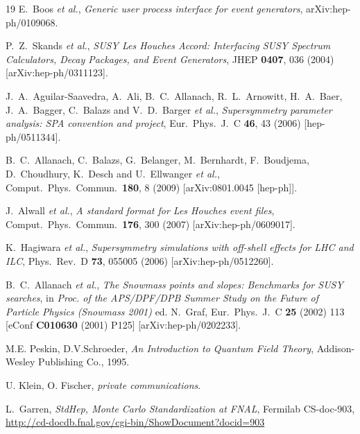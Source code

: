 \documentclass[12pt]{book}
\begin{document}
\begin{thebibliography}{19}
  E.~Boos {\it et al.},
  {\em Generic user process interface for event generators},
  arXiv:hep-ph/0109068.

  P.~Z.~Skands {\it et al.},
  {\em SUSY Les Houches Accord: Interfacing SUSY Spectrum Calculators, Decay
  Packages, and Event Generators},
  JHEP {\bf 0407}, 036 (2004)
  [arXiv:hep-ph/0311123].

  J.~A.~Aguilar-Saavedra, A.~Ali, B.~C.~Allanach, R.~L.~Arnowitt, H.~A.~Baer, J.~A.~Bagger, C.~Balazs and V.~D.~Barger {\it et al.},
  {\em Supersymmetry parameter analysis: SPA convention and project},
  Eur.\ Phys.\ J.\ C {\bf 46}, 43 (2006)
  [hep-ph/0511344].

  B.~C.~Allanach, C.~Balazs, G.~Belanger, M.~Bernhardt, F.~Boudjema, D.~Choudhury, K.~Desch and U.~Ellwanger {\it et al.},
  Comput.\ Phys.\ Commun.\  {\bf 180}, 8 (2009)
  [arXiv:0801.0045 [hep-ph]].

  J.~Alwall {\it et al.},
  {\em A standard format for Les Houches event files},
  Comput.\ Phys.\ Commun.\  {\bf 176}, 300 (2007)
  [arXiv:hep-ph/0609017].

  K.~Hagiwara {\it et al.},
  {\em Supersymmetry simulations with off-shell effects for LHC and
    ILC},
  Phys.\ Rev.\  D {\bf 73}, 055005 (2006)
  [arXiv:hep-ph/0512260].

  B.~C.~Allanach {\it et al.},
  {\em The Snowmass points and slopes: Benchmarks for SUSY searches},
  in {\it Proc. of the APS/DPF/DPB Summer Study on the Future of Particle Physics (Snowmass 2001) } ed. N.~Graf,
  Eur.\ Phys.\ J.\ C {\bf 25} (2002) 113
  [eConf {\bf C010630} (2001) P125]
  [arXiv:hep-ph/0202233].

  M.E. Peskin, D.V.Schroeder, {\em An Introduction to Quantum Field
    Theory}, Addison-Wesley Publishing Co., 1995.

  U. Klein, O. Fischer, {\em private communications}.

  L.~Garren, {\em StdHep, Monte Carlo Standardization at FNAL},
  Fermilab CS-doc-903,
  \url{http://cd-docdb.fnal.gov/cgi-bin/ShowDocument?docid=903}


\end{thebibliography}
\end{document}
